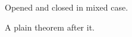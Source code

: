 \documentclass{article}
\begin{document}
\begin{Theorem}\label{thm:upper}
Opened and closed in mixed case.
\end{Theorem}

\begin{theorem}\label{thm:lower}
A plain theorem after it.
\end{theorem}
\end{document}
